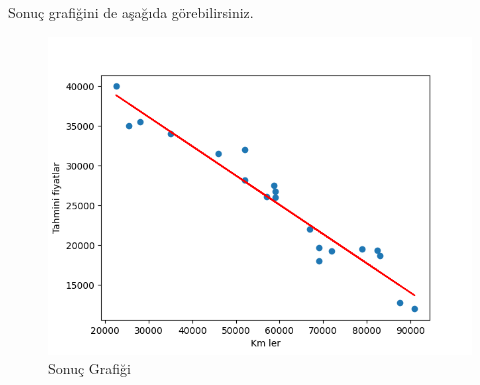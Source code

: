 \documentclass{article}
\begin{document}
Sonuç grafiğini de aşağıda görebilirsiniz.

\begin{figure}[htp]
    \centering
    \includegraphics{liR_sonuc.png}
    \caption{Sonuç Grafiği}
    \label{fig:my_label}
\end{figure}
\end{document}
